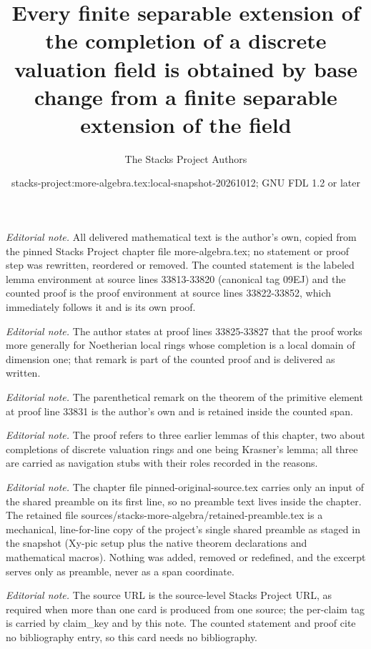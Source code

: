 \documentclass[10pt,a4paper]{amsart}
\title{Every finite separable extension of the completion of a discrete valuation field is obtained by base change from a finite separable extension of the field}
\author{The Stacks Project Authors}
\date{stacks-project:more-algebra.tex:local-snapshot-20261012; GNU FDL 1.2 or later}
\theoremstyle{plain}
\theoremstyle{definition}
\theoremstyle{remark}
\numberwithin{equation}{subsection}
\begin{document}
\maketitle
\setcounter{subsection}{1}
\noindent\textit{Editorial note.} All delivered mathematical text is the author's own, copied from the pinned Stacks Project chapter file more-algebra.tex; no statement or proof step was rewritten, reordered or removed. The counted statement is the labeled lemma environment at source lines 33813-33820 (canonical tag 09EJ) and the counted proof is the proof environment at source lines 33822-33852, which immediately follows it and is its own proof.\par\medskip
\noindent\textit{Editorial note.} The author states at proof lines 33825-33827 that the proof works more generally for Noetherian local rings whose completion is a local domain of dimension one; that remark is part of the counted proof and is delivered as written.\par\medskip
\noindent\textit{Editorial note.} The parenthetical remark on the theorem of the primitive element at proof line 33831 is the author's own and is retained inside the counted span.\par\medskip
\noindent\textit{Editorial note.} The proof refers to three earlier lemmas of this chapter, two about completions of discrete valuation rings and one being Krasner's lemma; all three are carried as navigation stubs with their roles recorded in the reasons.\par\medskip
\noindent\textit{Editorial note.} The chapter file pinned-original-source.tex carries only an input of the shared preamble on its first line, so no preamble text lives inside the chapter. The retained file sources/stacks-more-algebra/retained-preamble.tex is a mechanical, line-for-line copy of the project's single shared preamble as staged in the snapshot (Xy-pic setup plus the native theorem declarations and mathematical macros). Nothing was added, removed or redefined, and the excerpt serves only as preamble, never as a span coordinate.\par\medskip
\noindent\textit{Editorial note.} The source URL is the source-level Stacks Project URL, as required when more than one card is produced from one source; the per-claim tag is carried by claim\_key and by this note. The counted statement and proof cite no bibliography entry, so this card needs no bibliography.\par\medskip
\end{document}
